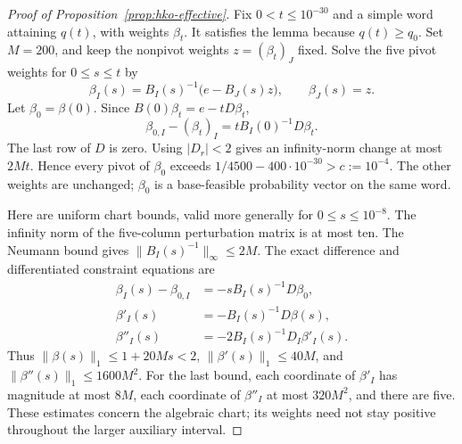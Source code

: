 \begin{proof}[Proof of Proposition~\ref{prop:hko-effective}]
Fix $0<t\leq10^{-30}$ and a simple word attaining $q(t)$, with weights
$\beta_t$. It satisfies the lemma because $q(t)\geq q_0$.
Set $M=200$, and keep the nonpivot weights $z=(\beta_t)_J$ fixed.
Solve the five pivot weights for $0\leq s\leq t$ by
\begin{equation}\label{eq:he-chart}
 \beta_I(s)=B_I(s)^{-1}\bigl(e-B_J(s)z\bigr),\qquad
 \beta_J(s)=z.
\end{equation}
Let $\beta_0=\beta(0)$. Since $B(0)\beta_t=e-tD\beta_t$,
\[
 \beta_{0,I}-(\beta_t)_I
       =tB_I(0)^{-1}D\beta_t.
\]
The last row of $D$ is zero. Using $|D_r|<2$ gives an infinity-norm
change at most $2Mt$. Hence every pivot of $\beta_0$ exceeds
$1/4500-400\cdot10^{-30}>c:=10^{-4}$. The other weights are unchanged;
$\beta_0$ is a base-feasible probability vector on the same word.

Here are uniform chart bounds, valid more generally for
$0\leq s\leq10^{-8}$. The infinity norm of the five-column
perturbation matrix is at most ten. The Neumann bound gives
$\|B_I(s)^{-1}\|_\infty\leq2M$. The exact difference and differentiated
constraint equations are
\[
 \begin{aligned}
 \beta_I(s)-\beta_{0,I}&=-sB_I(s)^{-1}D\beta_0,\\
 \beta'_I(s)&=-B_I(s)^{-1}D\beta(s),\\
 \beta''_I(s)&=-2B_I(s)^{-1}D_I\beta'_I(s).
 \end{aligned}
\]
Thus $\|\beta(s)\|_1\leq1+20Ms<2$,
$\|\beta'(s)\|_1\leq40M$, and
$\|\beta''(s)\|_1\leq1600M^2$. For the last bound, each
coordinate of $\beta'_I$ has magnitude at most $8M$, each
coordinate of $\beta''_I$ at most $320M^2$, and there are five.
These estimates concern the algebraic chart; its weights need not
stay positive throughout the larger auxiliary interval.


\end{proof}
